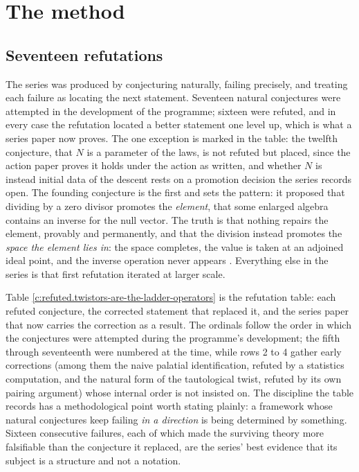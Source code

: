 \documentclass[11pt]{article}
\theoremstyle{definition}
\theoremstyle{plain}
\begin{document}
\section{The method}

\subsection*{Seventeen refutations}
\label{c:note.programme.setting-seventeen-refutations}
The series was produced by conjecturing naturally, failing precisely, and treating each failure as locating the next statement. Seventeen natural conjectures were attempted in the development of the programme; sixteen were refuted, and in every case the refutation located a better statement one level up, which is what a series paper now proves. The one exception is marked in the table: the twelfth conjecture, that $N$ is a parameter of the laws, is not refuted but placed, since the action paper proves it holds under the action as written, and whether $N$ is instead initial data of the descent rests on a promotion decision the series records open. The founding conjecture is the first and sets the pattern: it proposed that dividing by a zero divisor promotes the \emph{element}, that some enlarged algebra contains an inverse for the null vector. The truth is that nothing repairs the element, provably and permanently, and that the division instead promotes the \emph{space the element lies in}: the space completes, the value is taken at an adjoined ideal point, and the inverse operation never appears \cite{ButlerT1}. Everything else in the series is that first refutation iterated at larger scale.

Table \ref{c:refuted.twistors-are-the-ladder-operators} is the refutation table: each refuted conjecture, the corrected statement that replaced it, and the series paper that now carries the correction as a result. The ordinals follow the order in which the conjectures were attempted during the programme's development; the fifth through seventeenth were numbered at the time, while rows 2 to 4 gather early corrections (among them the naive palatial identification, refuted by a statistics computation, and the natural form of the tautological twist, refuted by its own pairing argument) whose internal order is not insisted on. The discipline the table records has a methodological point worth stating plainly: a framework whose natural conjectures keep failing \emph{in a direction} is being determined by something. Sixteen consecutive failures, each of which made the surviving theory more falsifiable than the conjecture it replaced, are the series' best evidence that its subject is a structure and not a notation.
\end{document}

